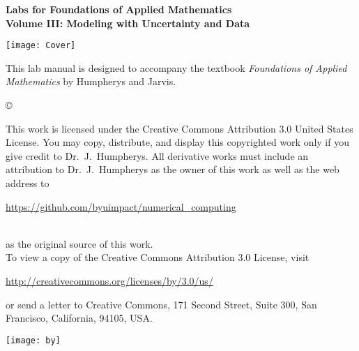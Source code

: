 \documentclass[nociteref]{SIAM-GH-book}
\begin{document}
\thispagestyle{empty}
\begin{center}
{\huge \bf Labs for Foundations of Applied Mathematics} \\
\vspace{5mm}
{\Large \bf Volume III: Modeling with
Uncertainty and Data}
\vspace{20mm}

\texttt{[image: Cover]}
\end{center}
\frontmatter




\begin{thepreface}
This lab manual is designed to accompany the textbook \emph{Foundations of Applied Mathematics} by Humpherys and Jarvis.

\vfill
\copyright{This work is licensed under the Creative Commons Attribution 3.0 United States
License.  You may copy, distribute, and display this copyrighted work only if you give
credit to Dr.~J.~Humpherys. All derivative works must include an attribution to Dr.~J.~Humpherys as the owner of this work as well as the web address to
\\\centerline{\url{https://github.com/byuimpact/numerical_computing}}\\ as the original source of
this
work.\\To view a copy of the Creative Commons Attribution 3.0 License,
visit\\\centerline{\url{http://creativecommons.org/licenses/by/3.0/us/}} or send a letter to
Creative Commons, 171 Second Street, Suite 300, San Francisco, California, 94105, USA.}

\vfill
\centering\texttt{[image: by]}
\vfill
\end{thepreface}
\end{document}
